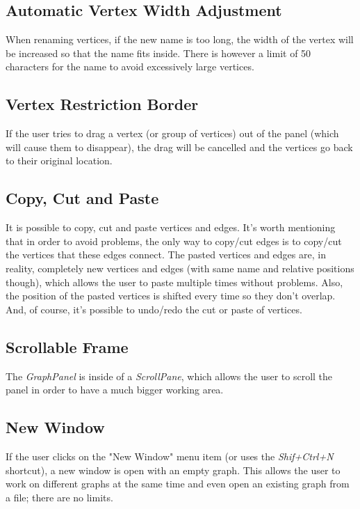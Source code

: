 \documentclass[a4paper]{article}
\begin{document}
\subsection{Automatic Vertex Width Adjustment}
\par When renaming vertices, if the new name is too long, the width of the vertex will be increased so that the name fits inside. There is however a limit of 50 characters for the name to avoid excessively large vertices.

\subsection{Vertex Restriction Border}
\par If the user tries to drag a vertex (or group of vertices) out of the panel (which will cause them to disappear), the drag will be cancelled and the vertices go back to their original location.

\subsection{Copy, Cut and Paste}
\par It is possible to copy, cut and paste vertices and edges. It's worth mentioning that in order to avoid problems, the only way to copy/cut edges is to copy/cut the vertices that these edges connect. The pasted vertices and edges are, in reality, completely new vertices and edges (with same name and relative positions though), which allows the user to paste multiple times without problems. Also, the position of the pasted vertices is shifted every time so they don't overlap. And, of course, it's possible to undo/redo the cut or paste of vertices.

\subsection{Scrollable Frame}
\par The \textit{GraphPanel} is inside of a \textit{ScrollPane}, which allows the user to scroll the panel in order to have a much bigger working area. 

\subsection{New Window}
\par If the user clicks on the "New Window" menu item (or uses the \textit{Shif+Ctrl+N} shortcut), a new window is open with an empty graph. This allows the user to work on different graphs at the same time and even open an existing graph from a file; there are no limits.
\end{document}

